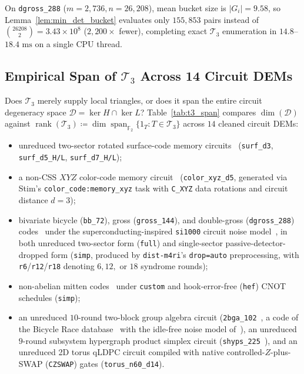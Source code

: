 \documentclass[12pt]{article}
\theoremstyle{definition}
\newcommand{\Ftwo}{\mathbb{F}_2}
\DeclareMathOperator{\rank}{rank}
\newcommand{\Dc}{\mathcal{D}}
\newcommand{\Tc}{\mathcal{T}_3}
\newcommand{\ttt}[1]{\texttt{#1}}
\begin{document}
\medskip
On \ttt{dgross\_288} ($m = 2{,}736, n = 26{,}208$), mean bucket size is $|G_i| = 9.58$, so
Lemma~\ref{lem:min_det_bucket} evaluates only $155{,}853$ pairs instead of $\binom{26208}{2} = 3.43 \times 10^8$
($2{,}200\times$ fewer), completing exact $\Tc$ enumeration in $14.8$--$18.4\text{ ms}$ on a single CPU thread.

\subsection{Empirical Span of \texorpdfstring{$\Tc$}{T3} Across 14 Circuit DEMs}\label{subsec:span_table}

Does $\Tc$ merely supply local triangles, or does it span the entire circuit degeneracy space $\Dc = \ker H \cap
\ker L$? Table~\ref{tab:t3_span} compares $\dim(\Dc)$ against $\rank(\Tc) \coloneqq \dim
\operatorname{span}_{\Ftwo}\{1_T : T \in \Tc\}$ across $14$ cleaned circuit DEMs:
\begin{itemize}
  \item unreduced two-sector rotated surface-code memory circuits~\cite{DennisKitaevLandahlPreskill2002,
    BombinMartinDelgado2007,Fowler2012} (\ttt{surf\_d3}, \ttt{surf\_d5\_H/L}, \ttt{surf\_d7\_H/L});
  \item a non-CSS $XYZ$ color-code memory circuit~\cite{BombinMartinDelgado2006Color,Gidney2021Stim}
    (\ttt{color\_xyz\_d5}, generated via Stim's \ttt{color\_code:memory\_xyz} task with \ttt{C\_XYZ} data rotations
    and circuit distance $d = 3$);
  \item bivariate bicycle (\ttt{bb\_72}), gross (\ttt{gross\_144}), and double-gross (\ttt{dgross\_288})
    codes~\cite{BravyiCrossGambettaMaslovRallYoder2024} under the superconducting-inspired \ttt{si1000} circuit
    noise model~\cite{GidneyNewmanFowlerBroughton2021}, in
    both unreduced two-sector form (\ttt{full}) and single-sector passive-detector-dropped form (\ttt{simp},
    produced by \ttt{dist-m4ri}'s \ttt{drop=auto} preprocessing, with \ttt{r6}/\ttt{r12}/\ttt{r18} denoting $6,
    12,$ or $18$ syndrome rounds);
  \item non-abelian mitten codes~\cite{Bhardwaj2026Mitten} under \ttt{custom} and hook-error-free (\ttt{hef})
    CNOT schedules (\ttt{simp});
  \item an unreduced $10$-round two-block group algebra circuit (\ttt{2bga\_102}~\cite{LinPryadko2024}, a code of the
    Bicycle Race database~\cite{Lee2026BicycleRace} with the idle-free noise model of~\cite{Zhao2026UltraHighRate}), an
    unreduced $9$-round subsystem hypergraph product simplex circuit (\ttt{shyps\_225}~\cite{Malcolm2025SHYPS}),
    and an unreduced 2D torus qLDPC circuit compiled with native controlled-$Z$-plus-SWAP (\ttt{CZSWAP}) gates
    (\ttt{torus\_n60\_d14}).
\end{itemize}
\end{document}
